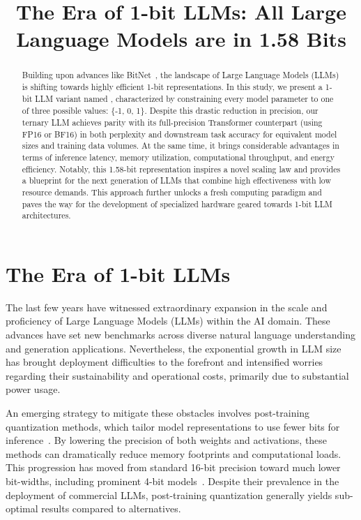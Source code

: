 \title{The Era of 1-bit LLMs: All Large Language Models are in 1.58 Bits}

\begin{abstract}
Building upon advances like BitNet~\cite{bitnet}, the landscape of Large Language Models (LLMs) is shifting towards highly efficient 1-bit representations. In this study, we present a 1-bit LLM variant named \textbf{}, characterized by constraining every model parameter to one of three possible values: \{-1, 0, 1\}. Despite this drastic reduction in precision, our ternary LLM achieves parity with its full-precision Transformer counterpart (using FP16 or BF16) in both perplexity and downstream task accuracy for equivalent model sizes and training data volumes. At the same time, it brings considerable advantages in terms of inference latency, memory utilization, computational throughput, and energy efficiency. Notably, this 1.58-bit representation inspires a novel scaling law and provides a blueprint for the next generation of LLMs that combine high effectiveness with low resource demands. This approach further unlocks a fresh computing paradigm and paves the way for the development of specialized hardware geared towards 1-bit LLM architectures.
\end{abstract}

\section{The Era of 1-bit LLMs}

The last few years have witnessed extraordinary expansion in the scale and proficiency of Large Language Models (LLMs) within the AI domain. These advances have set new benchmarks across diverse natural language understanding and generation applications. Nevertheless, the exponential growth in LLM size has brought deployment difficulties to the forefront and intensified worries regarding their sustainability and operational costs, primarily due to substantial power usage.

An emerging strategy to mitigate these obstacles involves post-training quantization methods, which tailor model representations to use fewer bits for inference~\cite{smoothquant, gptq, quip, quip_sharp}. By lowering the precision of both weights and activations, these methods can dramatically reduce memory footprints and computational loads. This progression has moved from standard 16-bit precision toward much lower bit-widths, including prominent 4-bit models~\cite{gptq, awq}. Despite their prevalence in the deployment of commercial LLMs, post-training quantization generally yields sub-optimal results compared to alternatives.

